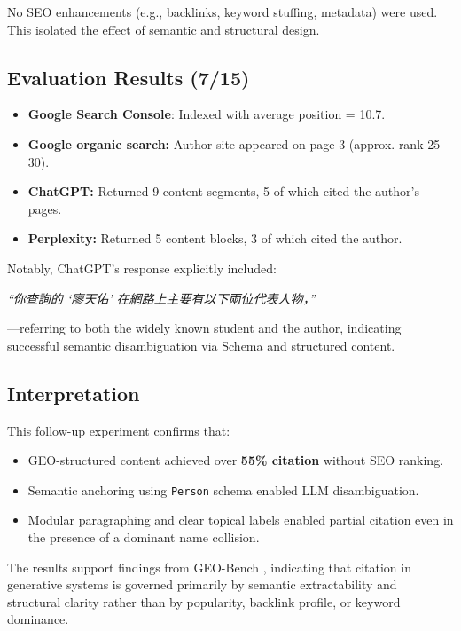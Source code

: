 No SEO enhancements (e.g., backlinks, keyword stuffing, metadata) were used. This isolated the effect of semantic and structural design.

\subsection{Evaluation Results (7/15)}

\begin{itemize}
  \item \textbf{Google Search Console}: Indexed with average position = 10.7.
  \item \textbf{Google organic search:} Author site appeared on page 3 (approx. rank 25--30).
  \item \textbf{ChatGPT:} Returned 9 content segments, 5 of which cited the author’s pages.
  \item \textbf{Perplexity:} Returned 5 content blocks, 3 of which cited the author.
\end{itemize}

Notably, ChatGPT’s response explicitly included:

\textit{“你查詢的 ‘廖天佑’ 在網路上主要有以下兩位代表人物，”}

---referring to both the widely known student and the author, indicating successful semantic disambiguation via Schema and structured content.

\subsection{Interpretation}

This follow-up experiment confirms that:

\begin{itemize}
  \item GEO-structured content achieved over \textbf{55\% citation} without SEO ranking.
  \item Semantic anchoring using \texttt{Person} schema enabled LLM disambiguation.
  \item Modular paragraphing and clear topical labels enabled partial citation even in the presence of a dominant name collision.
\end{itemize}

The results support findings from GEO-Bench \cite{aggarwal2024geo}, indicating that citation in generative systems is governed primarily by semantic extractability and structural clarity rather than by popularity, backlink profile, or keyword dominance.

